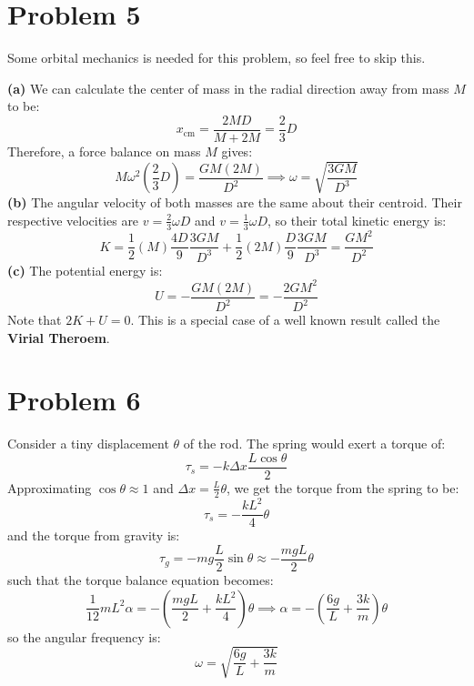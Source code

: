 \documentclass{article}
\let\oldtextbf\textbf
\renewcommand{\textbf}[1]{\oldtextbf{#1}\index{#1}}
\begin{document}
\section*{Problem 5}
Some orbital mechanics is needed for this problem, so feel free to skip this.

\textbf{(a)} We can calculate the center of mass in the radial direction away from mass $M$ to be:
\begin{equation}
    x_\text{cm} = \frac{2MD}{M+2M} = \frac{2}{3}D
    \label{eq:}
\end{equation}
Therefore, a force balance on mass $M$ gives:
\begin{equation}
    M\omega^2\left(\frac{2}{3}D\right) = \frac{GM(2M)}{D^2} \implies \omega = \sqrt{\frac{3GM}{D^3}}
    \label{eq:}
\end{equation}
\textbf{(b)} The angular velocity of both masses are the same about their centroid. Their respective velocities are $v=\frac{2}{3}\omega D$ and $v=\frac{1}{3}\omega D$, so their total kinetic energy is:
\begin{equation}
    K = \frac{1}{2}(M)\frac{4D}{9}\frac{3GM}{D^3} + \frac{1}{2}(2M)\frac{D}{9}\frac{3GM}{D^3} = \frac{GM^2}{D^2}
    \label{eq:}
\end{equation}
\textbf{(c)} The potential energy is:
\begin{equation}
    U = -\frac{GM(2M)}{D^2} = -\frac{2GM^2}{D^2}
    \label{eq:}
\end{equation}
Note that $2K+U=0$. This is a special case of a well known result called the \textbf{Virial Theroem}.
\section*{Problem 6} 
Consider a tiny displacement $\theta$ of the rod. The spring would exert a torque of:
\begin{equation}
    \tau_s = -k\Delta x \frac{L\cos\theta}{2}
\end{equation}
Approximating $\cos\theta\approx 1$ and $\Delta x = \frac{L}{2}\theta$, we get the torque from the spring to be:
\begin{equation}
    \tau_s = -\frac{kL^2}{4}\theta 
    \label{eq:}
\end{equation}
and the torque from gravity is:
\begin{equation}
    \tau_g = -mg\frac{L}{2}\sin\theta \approx -\frac{mgL}{2}\theta 
    \label{eq:}
\end{equation}
such that the torque balance equation becomes:
\begin{equation}
    \frac{1}{12}mL^2\alpha = -\left(\frac{mgL}{2} + \frac{kL^2}{4}\right)\theta \implies \alpha = -\left(\frac{6g}{L}+\frac{3k}{m}\right)\theta 
    \label{eq:}
\end{equation}
so the angular frequency is:
\begin{equation}
    \omega = \sqrt{\frac{6g}{L}+\frac{3k}{m}}
    \label{eq:}
\end{equation}
\end{document}
